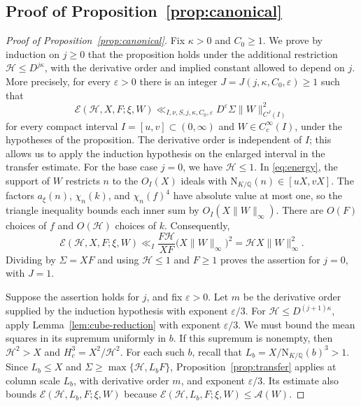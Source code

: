 \documentclass[11pt,a4paper]{article}
\numberwithin{equation}{section}
\numberwithin{figure}{section}
\theoremstyle{definition}
\theoremstyle{remark}
\newcommand{\Q}{\mathbb Q}
\newcommand{\NK}{\mathrm N_{K/\Q}}
\newcommand{\E}{\mathcal E}
\begin{document}
\subsection{Proof of Proposition~\ref{prop:canonical}}
\label{sec:canonical-proof}
\begin{proof}[Proof of Proposition~\ref{prop:canonical}]
Fix $\kappa>0$ and $C_0\ge1$. We prove by induction on $j\ge0$
that the proposition holds under the additional restriction
$\mathcal H\le D^{j\kappa}$, with the derivative order and implied
constant allowed to depend on $j$. More precisely, for every
$\varepsilon>0$ there is an integer $J=J(j,\kappa,C_0,\varepsilon)\ge1$
such that
\[
 \E(\mathcal H,X,F;\xi,W)
 \ll_{I,\nu,S,j,\kappa,C_0,\varepsilon}
 D^\varepsilon\Sigma\|W\|_{C^J(I)}^2
\]
for every compact interval $I=[u,v]\subset(0,\infty)$ and
$W\in C_c^\infty(I)$, under the hypotheses of the proposition.
The derivative order is independent of $I$; this allows us to apply
the induction hypothesis on the enlarged interval in the transfer estimate.
For the base case $j=0$, we have $\mathcal H\le1$.
In \eqref{eq:energy}, the support of $W$ restricts $n$ to the
$O_I(X)$ ideals with $\NK(n)\in[uX,vX]$.
The factors $a_\xi(n)$, $\chi_n(k)$, and $\chi_n(f)^4$ have absolute
value at most one, so the triangle inequality bounds each inner sum
by $O_I(X\|W\|_\infty)$.
There are $O(F)$ choices of $f$ and $O(\mathcal H)$ choices of $k$.
Consequently,
\[
 \E(\mathcal H,X,F;\xi,W)
 \ll_I\frac{F\mathcal H}{XF}
       \bigl(X\|W\|_\infty\bigr)^2
 =\mathcal H X\|W\|_\infty^2.
\]
Dividing by $\Sigma=XF$ and using $\mathcal H\le1$ and $F\ge1$
proves the assertion for $j=0$, with $J=1$.

Suppose the assertion holds for $j$, and fix $\varepsilon>0$.
Let $m$ be the derivative order supplied by the induction hypothesis
with exponent $\varepsilon/3$. For $\mathcal H\le D^{(j+1)\kappa}$,
apply Lemma~\ref{lem:cube-reduction} with exponent $\varepsilon/3$.
We must bound the mean squares in its supremum uniformly in $b$.
If this supremum is nonempty, then $\mathcal H^2>X$ and
$H_c^3=X^2/\mathcal H^2$.
For each such $b$, recall that $L_b=X/\NK(b)^3>1$.
Since $L_b\le X$ and $\Sigma\ge\max\{\mathcal H,L_bF\}$,
Proposition~\ref{prop:transfer} applies at column scale $L_b$, with derivative
order $m$, and exponent $\varepsilon/3$.
Its estimate also bounds $\E(\mathcal H,L_b,F;\xi,W)$ because
$\E(\mathcal H,L_b,F;\xi,W)\le\mathcal A(W)$.


\end{proof}
\end{document}

